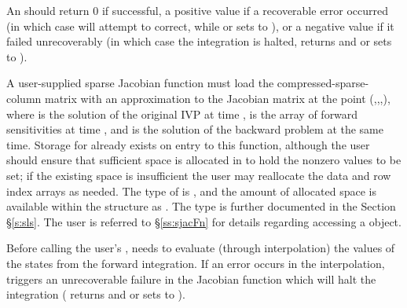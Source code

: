 {
  An  should return 0 if successful, a
  positive value if a recoverable error occurred (in which case
  {\idas} will attempt to correct, while {\idaklu} or {\idasuperlumt}
  sets  to ), or a negative
  value if it failed unrecoverably (in which case the integration is
  halted,  returns  and
  {\idaklu} or {\idasuperlumt} sets  to
  ).
}
{
  A user-supplied sparse Jacobian function must load the
  compressed-sparse-column matrix  with an approximation to
  the Jacobian matrix at the point (,,,),
  where  is the solution of the original IVP at time ,
   is the array of forward sensitivities at time , and
   is the solution of the backward problem at the same time.
  Storage for  already exists on entry to this function,
  although the user should ensure that sufficient space is allocated
  in  to hold the nonzero values to be set; if the existing
  space is insufficient the user may reallocate the data and row index
  arrays as needed.  The type of  is , and the
  amount of allocated space is available within the 
  structure as .  The  type is further documented
  in the Section \S\ref{s:sls}.  The user is referred to
  \S\ref{ss:sjacFn} for details regarding accessing a 
  object.

  {\warn}Before calling the user's , {\idas}
  needs to evaluate (through interpolation) the values of the states
  from the forward integration.  If an error occurs in the
  interpolation, {\idas} triggers an unrecoverable failure in the
  Jacobian function which will halt the integration (
  returns  and {\idaklu} or {\idasuperlumt} sets
   to ).
}


